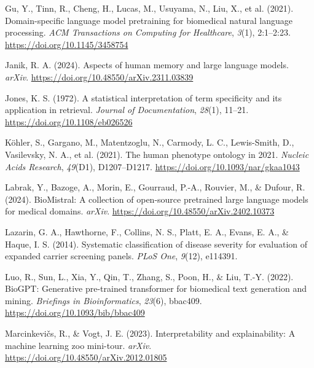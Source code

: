 \documentclass[
]{agujournal2019}
\newlength{\cslhangindent}
\newenvironment{CSLReferences}[2] %
 {\begin{list}{}{%
  \setlength{\itemindent}{0pt}
  \setlength{\leftmargin}{0pt}
  \setlength{\parsep}{0pt}
  \ifodd #1
   \setlength{\leftmargin}{\cslhangindent}
   \setlength{\itemindent}{-1\cslhangindent}
  \fi
  \setlength{\itemsep}{#2\baselineskip}}}
 {\end{list}}
\begin{document}
\begin{CSLReferences}{1}{0}
Gu, Y., Tinn, R., Cheng, H., Lucas, M., Usuyama, N., Liu, X., et al.
(2021). Domain-specific language model pretraining for biomedical
natural language processing. \emph{ACM Transactions on Computing for
Healthcare}, \emph{3}(1), 2:1--2:23.
\url{https://doi.org/10.1145/3458754}

Janik, R. A. (2024). Aspects of human memory and large language models.
\emph{arXiv}. \url{https://doi.org/10.48550/arXiv.2311.03839}

Jones, K. S. (1972). A statistical interpretation of term specificity
and its application in retrieval. \emph{Journal of Documentation},
\emph{28}(1), 11--21. \url{https://doi.org/10.1108/eb026526}

Köhler, S., Gargano, M., Matentzoglu, N., Carmody, L. C., Lewis-Smith,
D., Vasilevsky, N. A., et al. (2021). The human phenotype ontology in
2021. \emph{Nucleic Acids Research}, \emph{49}(D1), D1207--D1217.
\url{https://doi.org/10.1093/nar/gkaa1043}

Labrak, Y., Bazoge, A., Morin, E., Gourraud, P.-A., Rouvier, M., \&
Dufour, R. (2024). BioMistral: A collection of open-source pretrained
large language models for medical domains. \emph{arXiv}.
\url{https://doi.org/10.48550/arXiv.2402.10373}

Lazarin, G. A., Hawthorne, F., Collins, N. S., Platt, E. A., Evans, E.
A., \& Haque, I. S. (2014). Systematic classification of disease
severity for evaluation of expanded carrier screening panels. \emph{PLoS
One}, \emph{9}(12), e114391.

Luo, R., Sun, L., Xia, Y., Qin, T., Zhang, S., Poon, H., \& Liu, T.-Y.
(2022). BioGPT: Generative pre-trained transformer for biomedical text
generation and mining. \emph{Briefings in Bioinformatics}, \emph{23}(6),
bbac409. \url{https://doi.org/10.1093/bib/bbac409}

Marcinkevičs, R., \& Vogt, J. E. (2023). Interpretability and
explainability: A machine learning zoo mini-tour. \emph{arXiv}.
\url{https://doi.org/10.48550/arXiv.2012.01805}


\end{CSLReferences}
\end{document}
